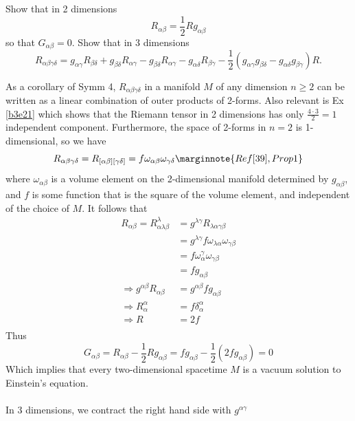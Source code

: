 \documentclass[10pt]{article}
\begin{document}
\begin{example}
	Show that in 2 dimensions
	$$
	R_{\alpha\beta}=\frac12 Rg_{\alpha\beta}
	$$
	so that $G_{\alpha\beta}=0$. Show that in 3 dimensions
	$$
	R_{\alpha\beta\gamma\delta} = g_{\alpha\gamma}R_{\beta\delta} + g_{\beta\delta}R_{\alpha\gamma} - g_{\beta\delta}R_{\alpha\gamma} - g_{\alpha\delta}R_{\beta\gamma} - \frac12(g_{\alpha\gamma}g_{\beta\delta}-g_{\alpha\delta}g_{\beta\gamma})R.
	$$
\end{example}
\sol As a corollary of Symm 4, $R_{\alpha\beta\gamma\delta}$ in a manifold $M$ of any dimension $n \ge 2$ can be written as a linear combination of outer products of 2-forms. Also relevant is Ex \ref{b3e21} which shows that the Riemann tensor in 2 dimensions has only $\frac{4\cdot3}{2}=1$ independent component. Furthermore, the space of 2-forms in $n=2$ is 1-dimensional, so we have
$$
R_{\alpha\beta\gamma\delta} =R_{[\alpha\beta][\gamma\delta]} = f\omega_{\alpha\beta}\omega_{\gamma\delta}\marginnote{Ref [39], Prop 1}
$$
where $\omega_{\alpha\beta}$ is a volume element on the 2-dimensional manifold determined by $g_{\alpha\beta}$, and $f$ is some function that is the square of the volume element, and independent of the choice of $M$. It follows that
$$
\begin{aligned}
	R_{\alpha\beta} = R_{\alpha\lambda\beta}^\lambda &= g^{\lambda\gamma}R_{\lambda\alpha\gamma\beta}\\
	&= g^{\lambda\gamma}f\omega_{\lambda\alpha}\omega_{\gamma\beta}\\
	&= f\omega_\alpha^\gamma\omega_{\gamma\beta}\\
	&= fg_{\alpha\beta}\\
	\Rightarrow g^{\alpha\beta}R_{\alpha\beta} &= g^{\alpha\beta}fg_{\alpha\beta}\\
	\Rightarrow R_\alpha^\alpha &= f\delta_\alpha^\alpha\\
	\Rightarrow R&=2f\\
\end{aligned}
$$
Thus
$$
G_{\alpha\beta}=R_{\alpha\beta}-\frac12Rg_{\alpha\beta}=fg_{\alpha\beta}-\frac12(2fg_{\alpha\beta})=0
$$
Which implies that every two-dimensional spacetime $M$ is a vacuum solution to Einstein's equation.\\\\
In 3 dimensions, we contract the right hand side with $g^{\alpha\gamma}$
\end{document}
